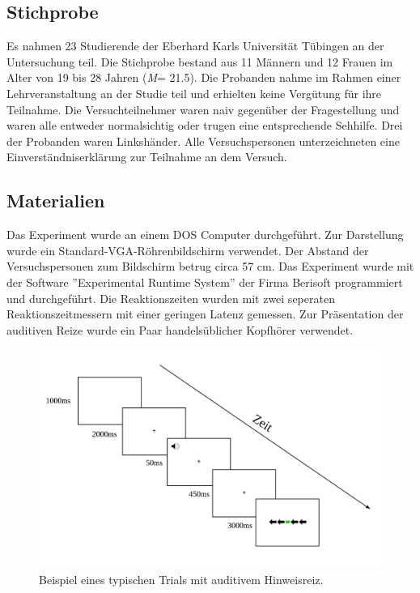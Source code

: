 \subsection{Stichprobe}
Es nahmen 23 Studierende der Eberhard Karls Universität Tübingen an der Untersuchung teil. Die Stichprobe bestand aus 11 Männern und 12 Frauen im Alter von 19 bis 28 Jahren (\textit{M}= 21.5). Die Probanden nahme im Rahmen einer Lehrveranstaltung an der Studie teil und erhielten keine Vergütung für ihre Teilnahme. Die Versuchteilnehmer waren naiv gegenüber der Fragestellung und waren alle entweder normalsichtig oder trugen eine entsprechende Sehhilfe. Drei der Probanden waren Linkshänder. Alle Versuchspersonen unterzeichneten eine Einverständniserklärung zur Teilnahme an dem Versuch.

\subsection{Materialien}
Das Experiment wurde an einem DOS Computer durchgeführt. 
Zur Darstellung wurde ein Standard-VGA-Röhrenbildschirm verwendet. Der Abstand der Versuchspersonen zum Bildschirm betrug circa 57 cm. Das Experiment wurde mit der Software ''Experimental Runtime System'' der Firma Berisoft programmiert und durchgeführt. Die Reaktionszeiten wurden mit zwei seperaten Reaktionszeitmessern mit einer geringen Latenz gemessen. Zur Präsentation der auditiven Reize wurde ein Paar handelsüblicher Kopfhörer verwendet.
\begin{figure}[t]
	\centering
  \includegraphics[width=\textwidth]{grafiken/Ablauf.png}
	\caption{Beispiel eines typischen Trials mit auditivem Hinweisreiz.}
	\label{fig:ablauf}
\end{figure}
